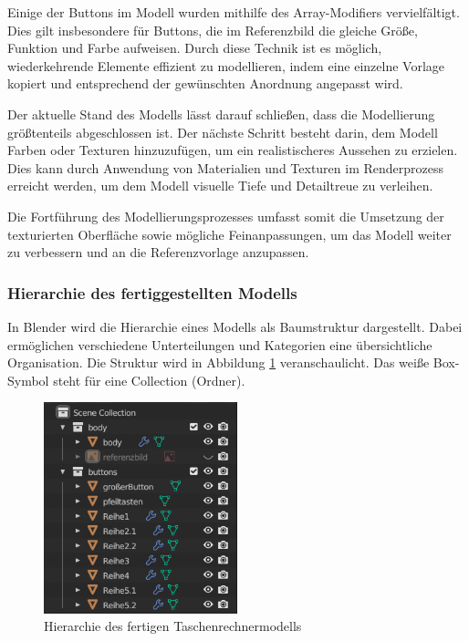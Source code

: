 Einige der Buttons im Modell wurden mithilfe des Array-Modifiers vervielfältigt. Dies gilt insbesondere für Buttons, die im Referenzbild die gleiche Größe, Funktion und Farbe aufweisen. Durch diese Technik ist es möglich, wiederkehrende Elemente effizient zu modellieren, indem eine einzelne Vorlage kopiert und entsprechend der gewünschten Anordnung angepasst wird.

Der aktuelle Stand des Modells lässt darauf schließen, dass die Modellierung größtenteils abgeschlossen ist. Der nächste Schritt besteht darin, dem Modell Farben oder Texturen hinzuzufügen, um ein realistischeres Aussehen zu erzielen. Dies kann durch Anwendung von Materialien und Texturen im Renderprozess erreicht werden, um dem Modell visuelle Tiefe und Detailtreue zu verleihen.

Die Fortführung des Modellierungsprozesses umfasst somit die Umsetzung der texturierten Oberfläche sowie mögliche Feinanpassungen, um das Modell weiter zu verbessern und an die Referenzvorlage anzupassen.

\subsubsection*{Hierarchie des fertiggestellten Modells}
In Blender wird die Hierarchie eines Modells als Baumstruktur dargestellt. Dabei ermöglichen verschiedene Unterteilungen und Kategorien eine übersichtliche Organisation. Die Struktur wird in Abbildung
\ref{fig:hierarchie} veranschaulicht. Das weiße Box-Symbol steht für eine Collection (Ordner).

\begin{figure}[H]
    \centering
    \includegraphics[width=0.5\textwidth]{images/hierarchietaschenrechner.png}
    \caption{Hierarchie des fertigen Taschenrechnermodells}
    \label{fig:hierarchie}
\end{figure}

